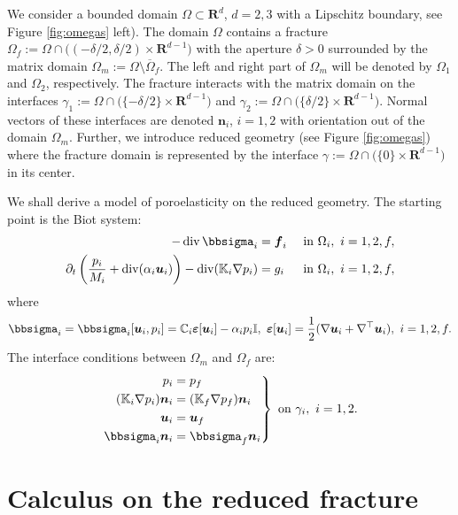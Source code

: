 \documentclass[a4paper]{article}
\def\prtl{\partial}
\def\vc#1{\mathbf{\boldsymbol{#1}}}     %
\def\tn#1{{\mathbb{#1}}}    %
\def\div{\operatorname{div}}
\def\ep{\vc\varepsilon}
\def\ff{\vc f}
\def\Real{{\mathbf R}}
\def\nn{\vc n}
\def\uu{\vc u}
\newcommand{\note}[2]{{\color{blue} \textbf{ #1:} \textit{#2}}}
\begin{document}
We consider a bounded domain $\Omega \subset \Real^d$, $d=2,3$ with a Lipschitz boundary, see Figure \ref{fig:omegas} left). The domain $\Omega$ contains 
a fracture $\Omega_f:=\Omega\cap \big((-\delta/2,\delta/2)\times\Real^{d-1}\big)$ 
with the aperture $\delta>0$ surrounded by the matrix domain $\Omega_m:=\Omega\setminus\overline\Omega_f$. 
The left and right part of $\Omega_m$ will be denoted by $\Omega_{1}$ and $\Omega_{2}$, respectively.
The fracture interacts with the matrix domain on the interfaces 
$\gamma_1:=\Omega\cap\big( \{-\delta/2\}\times \Real^{d-1}\big)$ and 
$\gamma_2:=\Omega\cap\big( \{ \delta/2\}\times \Real^{d-1}\big)$. Normal vectors of these interfaces are denoted $\vc n_i$, $i=1,2$ with orientation out of the domain $\Omega_m$.
Further, we introduce reduced geometry (see Figure \ref{fig:omegas})
where the fracture domain is represented by the interface $\gamma:=\Omega\cap\big(\{0\}\times\Real^{d-1}\big)$ in its center. 

We shall derive a model of poroelasticity on the reduced geometry.
The starting point is the Biot system:
\begin{subequations}
\label{eq:biot}
\begin{align}
    \label{eq:lin_el}
    -\div \bbsigma_i &= \ff_i &&\mbox{ in }\Omega_i, ~i=1,2,f,\\
\label{eq:biot_darcy}    \prtl_t\left(\frac{p_i}{M_i} + \div(\alpha_i\uu_i)\right)-\div(\tn K_i\nabla p_i) &= g_i &&\mbox{ in }\Omega_i, ~i=1,2,f,
\end{align}
\end{subequations}
where
\[ \bbsigma_i = \bbsigma_i[\uu_i,p_i] = \tn C_i\ep[\uu_i]-\alpha_i p_i\tn I,~\ep[\uu_i]=\frac12(\nabla\uu_i+\nabla^\top\uu_i),~i=1,2,f. \]
The interface conditions between $\Omega_m$ and $\Omega_f$ are:
\[ \left.\begin{aligned}
p_i &= p_f\\
(\tn K_i\nabla p_i)\nn_i &= (\tn K_f\nabla p_f)\nn_i\\
\uu_i &= \uu_f\\
\bbsigma_i\nn_i &= \bbsigma_f\nn_i
\end{aligned} \right\} \mbox{ on }\gamma_i,~i=1,2. \]




\section{Calculus on the reduced fracture}
\end{document}
